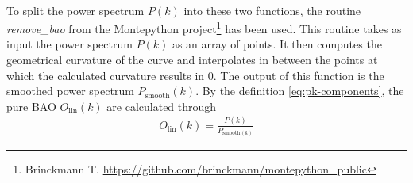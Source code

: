  \\
 To split the power spectrum $P(k)$ into these two functions, the routine \textit{remove\_bao} from the Montepython project\footnote{Brinckmann T. \url{https://github.com/brinckmann/montepython_public}} \cite{montepython} has been used. This routine takes as input the power spectrum $P(k)$ as an array of points. It then computes the geometrical curvature of the curve and interpolates in between the points at which the calculated curvature results in 0. The output of this function is the smoothed power spectrum $P_{\text{smooth}}(k)$. By the definition \eqref{eq:pk-components}, the pure BAO  $O_{\text{lin}}(k)$ are calculated through 
\begin{align}
	O_{\text{lin}}(k) = \frac{P(k)}{P_{\text{smooth}(k)}}
\end{align}

